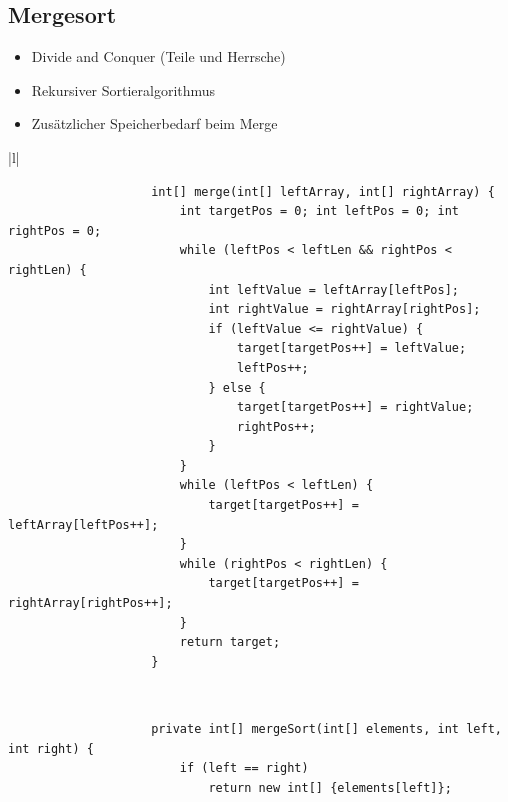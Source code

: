 \documentclass[a4paper, landscape, 8pt]{scrartcl}
\begin{document}
\begin{multicols*}{4}
            \subsection{Mergesort}
                \begin{itemize}
                    \item Divide and Conquer (Teile und Herrsche)
                    \item Rekursiver Sortieralgorithmus
                    \item Zusätzlicher Speicherbedarf beim Merge
                \end{itemize}
                \begin{tabular}{|l|}
                    \hline
                    \begin{lstlisting}
                    int[] merge(int[] leftArray, int[] rightArray) {
                        int targetPos = 0; int leftPos = 0; int rightPos = 0;
                        while (leftPos < leftLen && rightPos < rightLen) {
                            int leftValue = leftArray[leftPos];
                            int rightValue = rightArray[rightPos];
                            if (leftValue <= rightValue) {
                                target[targetPos++] = leftValue;
                                leftPos++;
                            } else {
                                target[targetPos++] = rightValue;
                                rightPos++;
                            }
                        }
                        while (leftPos < leftLen) {
                            target[targetPos++] = leftArray[leftPos++];
                        }
                        while (rightPos < rightLen) {
                            target[targetPos++] = rightArray[rightPos++];
                        }
                        return target;
                    }
                    \end{lstlisting} \\
                    \hline
                    \begin{lstlisting}
                    private int[] mergeSort(int[] elements, int left, int right) {
                        if (left == right)
                            return new int[] {elements[left]};


\end{lstlisting}
\end{tabular}
\end{multicols*}
\end{document}
